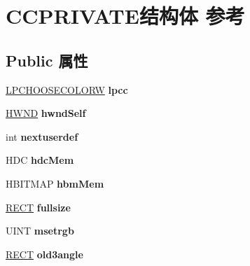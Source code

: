 \hypertarget{struct_c_c_p_r_i_v_a_t_e}{}\section{C\+C\+P\+R\+I\+V\+A\+T\+E结构体 参考}
\label{struct_c_c_p_r_i_v_a_t_e}
\subsection*{Public 属性}
\begin{DoxyCompactItemize}
\item 
\mbox{\label{struct_c_c_p_r_i_v_a_t_e_ab945d9a2db7e5b8968a0975f5404a936}} 
\hyperlink{structtag_c_h_o_o_s_e_c_o_l_o_r_w}{L\+P\+C\+H\+O\+O\+S\+E\+C\+O\+L\+O\+RW} {\bfseries lpcc}
\item 
\mbox{\label{struct_c_c_p_r_i_v_a_t_e_a52a4f10d1413291381b4e7c6df42a606}} 
\hyperlink{interfacevoid}{H\+W\+ND} {\bfseries hwnd\+Self}
\item 
\mbox{\label{struct_c_c_p_r_i_v_a_t_e_a4c65df0472ab3261d2a2e6979d6aca57}} 
int {\bfseries nextuserdef}
\item 
\mbox{\label{struct_c_c_p_r_i_v_a_t_e_abf5136cb1d5dd1b40ac1d02cfab32c95}} 
H\+DC {\bfseries hdc\+Mem}
\item 
\mbox{\label{struct_c_c_p_r_i_v_a_t_e_a3853a866fb8feec19a20d349661c9b36}} 
H\+B\+I\+T\+M\+AP {\bfseries hbm\+Mem}
\item 
\mbox{\label{struct_c_c_p_r_i_v_a_t_e_aac911c37c1a6ce76343155c5a7c19409}} 
\hyperlink{structtag_r_e_c_t}{R\+E\+CT} {\bfseries fullsize}
\item 
\mbox{\label{struct_c_c_p_r_i_v_a_t_e_a2198fa4cbc8b23bcdbf363dbdcf2cf1d}} 
U\+I\+NT {\bfseries msetrgb}
\item 
\mbox{\label{struct_c_c_p_r_i_v_a_t_e_aeaa7fed0eaf9b712c14b8be2a66f8f96}} 
\hyperlink{structtag_r_e_c_t}{R\+E\+CT} {\bfseries old3angle}
\item 
\mbox{\label{struct_c_c_p_r_i_v_a_t_e_a9e71d7fb60882b875be6e8447c5bc8f7}} 

\end{DoxyCompactItemize}

